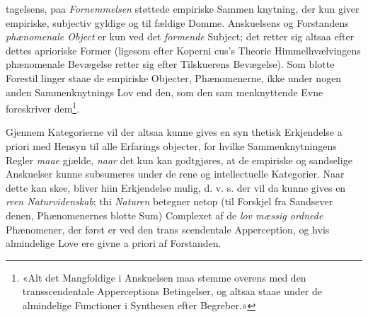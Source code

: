 \documentclass[12pt,a4paper]{book}
\begin{document}
tagelsens, paa \emph{Fornemmelsen} støttede empiriske Sammen\-%
knytning, der kun giver empiriske, subjectiv gyldige og til\-%
fældige Domme. Anskuelsens og Forstandens \emph{phænomenale
Object} er kun ved det \emph{formende} Subject; det retter sig
altsaa efter dettes aprioriske Former (ligesom efter Koperni\-%
cus's Theorie Himmelhvælvingens phænomenale Bevægelse
retter sig efter Tilskuerens Bevægelse). Som blotte Forestil\-%
linger staae de empiriske Objecter, Phænomenerne, ikke under
nogen anden Sammenknytnings Lov end den, som den sam\-%
menknyttende Evne foreskriver dem\footnote{«Alt det Mangfoldige i Anskuelsen maa stemme overens med den
transscendentale Apperceptions Betingelser, og altsaa staae under
de almindelige Functioner i Synthesen efter Begreber.»}.

Gjennem Kategorierne vil der altsaa kunne gives en syn\-%
thetisk Erkjendelse a priori med Hensyn til alle Erfarings\-%
objecter, for hvilke Sammenknytningens Regler \emph{maae} gjælde,
\emph{naar} det kun kan godtgjøres, at de empiriske og sandselige
Anskuelser kunne subsumeres under de rene og intellectuelle
Kategorier. Naar dette kan skee, bliver hiin Erkjendelse mulig,
d. v. s. der vil da kunne gives en \emph{reen Naturvidenskab};
thi \emph{Naturen} betegner netop (til Forskjel fra Sandsever\-%
denen, Phænomenernes blotte Sum) Complexet af de \emph{lov\-%
mæssig ordnede} Phænomener, der først er ved den trans\-%
scendentale Apperception, og hvis almindelige Love ere givne
a priori af Forstanden.
\end{document}
